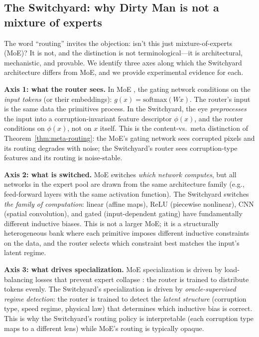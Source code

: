 \documentclass[11pt,a4paper]{article}
\begin{document}
\subsection{The Switchyard: why Dirty Man is not a mixture of experts}
\label{sec:switchyard}

The word ``routing'' invites the objection: isn't this just mixture-of-experts
(MoE)? It is not, and the distinction is not terminological---it is
architectural, mechanistic, and provable. We identify three axes along which
the Switchyard architecture differs from MoE, and we provide experimental
evidence for each.

\textbf{Axis 1: what the router sees.} In MoE \cite{switchtransformer}, the
gating network conditions on the \emph{input tokens} (or their embeddings):
$g(x) = \text{softmax}(Wx)$. The router's input is the same data the
primitives process. In the Switchyard, the eye \emph{preprocesses} the input
into a corruption-invariant feature descriptor $\phi(x)$, and the router
conditions on $\phi(x)$, not on $x$ itself. This is the content-vs.\ meta
distinction of Theorem~\ref{thm:meta-routing}: the MoE's gating network
sees corrupted pixels and its routing degrades with noise; the Switchyard's
router sees corruption-type features and its routing is noise-stable.

\textbf{Axis 2: what is switched.} MoE switches \emph{which network computes},
but all networks in the expert pool are drawn from the same architecture
family (e.g., feed-forward layers with the same activation function). The
Switchyard switches \emph{the family of computation}: linear (affine maps),
ReLU (piecewise nonlinear), CNN (spatial convolution), and gated
(input-dependent gating) have fundamentally different inductive biases. This
is not a larger MoE; it is a structurally heterogeneous bank where each
primitive imposes different inductive constraints on the data, and the router
selects which constraint best matches the input's latent regime.

\textbf{Axis 3: what drives specialization.} MoE specialization is driven by
load-balancing losses that prevent expert collapse \cite{switchtransformer}:
the router is trained to distribute tokens evenly. The Switchyard's
specialization is driven by \emph{oracle-supervised regime detection}: the
router is trained to detect the \emph{latent structure} (corruption type,
speed regime, physical law) that determines which inductive bias is correct.
This is why the Switchyard's routing policy is interpretable (each corruption
type maps to a different lens) while MoE's routing is typically opaque.
\end{document}
